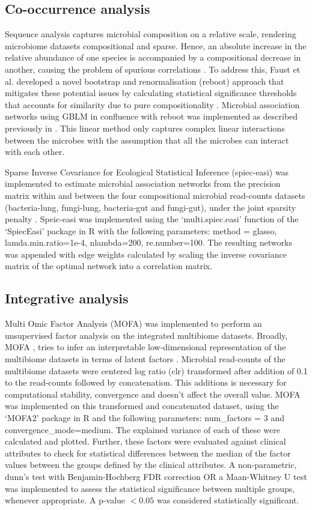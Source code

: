 \subsection{Co-occurrence analysis}
Sequence analysis captures microbial composition on a relative scale, rendering microbiome datasets compositional and sparse. Hence, an absolute increase in the relative abundance of one species is accompanied by a compositional decrease in another, causing the problem of spurious correlations \cite{Aitchison1982}. To address this, Faust et al. developed a novel bootstrap and renormalisation (reboot) approach that mitigates these potential issues by calculating statistical significance thresholds that accounts for similarity due to pure compositionality \cite{Faust2012}. Microbial association networks using GBLM in confluence with reboot was implemented as described previously in \cite{Narayana2019}. This linear method only captures complex linear interactions between the microbes with the assumption that all the microbes can interact with each other. 
 
Sparse Inverse Covariance for Ecological Statistical Inference (spiec-easi) was implemented to estimate microbial association networks from the precision matrix within and between the four compositional microbial read-counts datasets (bacteria-lung, fungi-lung, bacteria-gut and fungi-gut), under the joint sparsity penalty \cite{Kurtz2015}. Speic-easi was implemented using the `multi.spiec.easi' function of the `SpiecEasi' package in R with the following parameters: method = glasso, lamda.min.ratio=1e-4, nlambda=200, re.number=100. The resulting networks was appended with edge weights calculated by scaling the inverse covariance matrix of the optimal network into a correlation matrix.


\subsection{Integrative analysis}
Multi Omic Factor Analysis (MOFA) was implemented to perform an unsupervised factor analysis on the integrated multibiome datasets. Broadly, MOFA , tries to infer an interpretable low-dimensional representation of the multibiome datasets in terms of latent factors \cite{Argelaguet2020}. Microbial read-counts of the multibiome datasets were centered log ratio (clr) transformed after addition of 0.1 to the read-counts followed by concatenation. This additions is necessary for computational stability, convergence and doesn't affect the overall value. MOFA was implemented on this transformed and concatenated dataset, using the `MOFA2' package in R and the following parameters: num\_factors = 3 and convergence\_mode=medium. The explained variance of each of these were calculated and plotted. Further, these factors were evaluated against clinical attributes to check for statistical differences between the median of the factor values between the groups defined by the clinical attributes. A non-parametric, dunn's test with Benjamin-Hochberg FDR correction OR a Maan-Whitney U test was implemented to assess the statistical significance between multiple groups, whenever appropriate. A p-value $< 0.05$ was considered statistically significant.

